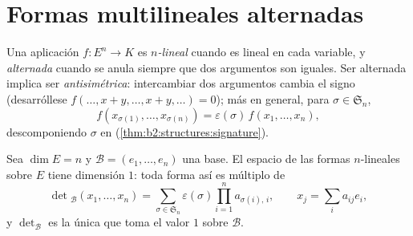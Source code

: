 \section{Formas multilineales alternadas}

\begin{definition}\label{def:b2:linalg:alternating}
Una aplicación $f \colon E^n \to K$ es \emph{$n$-lineal} cuando es
lineal en cada variable, y \emph{alternada}
cuando se anula siempre que dos argumentos son iguales. Ser alternada
implica ser \emph{antisimétrica}: intercambiar dos argumentos cambia
el signo (desarróllese $f(\dots, x + y, \dots, x + y, \dots) = 0$);
más en general, para $\sigma \in \mathfrak{S}_n$,
\[
f(x_{\sigma(1)}, \dots, x_{\sigma(n)}) =
\varepsilon(\sigma)\, f(x_1, \dots, x_n),
\]
descomponiendo $\sigma$ en 
(\cref{thm:b2:structures:signature}).
\end{definition}

\begin{theorem}\label{thm:b2:linalg:detspace}
Sea $\dim E = n$ y $\mathcal{B} = (e_1, \dots, e_n)$ una base. El
espacio de las formas $n$-lineales  sobre $E$ tiene
dimensión $1$: toda forma así es múltiplo de
\[
\det{}_{\mathcal{B}}(x_1, \dots, x_n)
= \sum_{\sigma \in \mathfrak{S}_n} \varepsilon(\sigma)
\prod_{i=1}^{n} a_{\sigma(i),\,i},
\qquad
x_j = \sum_{i} a_{ij} e_i ,
\]
y $\det_{\mathcal{B}}$ es la única que toma el valor $1$ sobre
$\mathcal{B}$.
\end{theorem}

